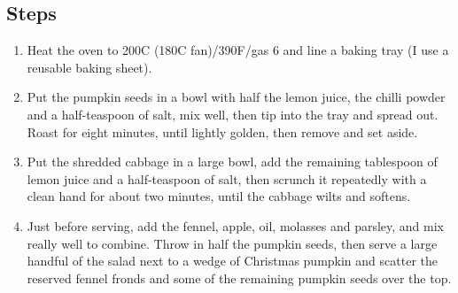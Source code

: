 \documentclass{book}
\begin{document}
\subsection*{Steps}
\begin{enumerate}
\item Heat the oven to 200C (180C fan)/390F/gas 6 and line a baking tray (I use a reusable baking sheet).
\item Put the pumpkin seeds in a bowl with half the lemon juice, the chilli powder and a half-teaspoon of salt, mix well, then tip into the tray and spread out. Roast for eight minutes, until lightly golden, then remove and set aside.
\item Put the shredded cabbage in a large bowl, add the remaining tablespoon of lemon juice and a half-teaspoon of salt, then scrunch it repeatedly with a clean hand for about two minutes, until the cabbage wilts and softens.
\item Just before serving, add the fennel, apple, oil, molasses and parsley, and mix really well to combine. Throw in half the pumpkin seeds, then serve a large handful of the salad next to a wedge of Christmas pumpkin and scatter the reserved fennel fronds and some of the remaining pumpkin seeds over the top.
\end{enumerate}
\newpage
\end{document}
